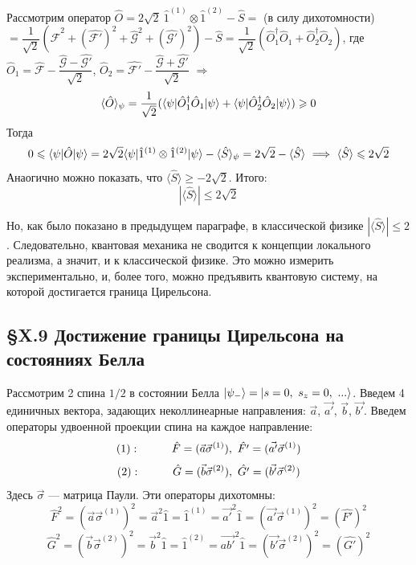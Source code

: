 Рассмотрим оператор $\hat{O} = 2\sqrt{2}~\hat{1}^{(1)}\otimes\hat{1}^{(2)} - \hat{S} = $ (в силу дихотомности) $= \dfrac{1}{\sqrt{2}}(\hat{\mathcal{F}}^2 + (\hat{\mathcal{F'}})^2 + \hat{\mathcal{G}}^2 + (\hat{\mathcal{G'}})^2) - \hat{S} = \dfrac{1}{\sqrt{2}}(\hat{O}_1^\dagger\hat{O}_1 + \hat{O}_2^\dagger\hat{O}_2)$, где $\hat{O}_1 = \hat{\mathcal{F}} - \dfrac{\hat{\mathcal{G}} - \hat{\mathcal{G'}}}{\sqrt{2}}$, $\hat{O}_2 = \hat{\mathcal{F'}} - \dfrac{\hat{\mathcal{G}} + \hat{\mathcal{G'}}}{\sqrt{2}}$ $\Longrightarrow$
\[
\langle\hat{O}\rangle_\psi = \dfrac{1}{\sqrt{2}}(\langle \psi | \hat{O}_1^\dagger\hat{O}_1 | \psi \rangle + \langle \psi | \hat{O}_2^\dagger\hat{O}_2 | \psi \rangle) \geqslant 0
\]
Тогда
\[
0 \leq \braupket{\psi}{\hat{O}}{\psi} = 2\sqrt{2} \braupket{\psi}{\hat{1}^{(1)}\otimes\hat{1}^{(2)}}{\psi} - \langle \hat{S}\rangle_\psi = 2\sqrt{2} - \langle \hat{S}\rangle \ \Longrightarrow \ \langle \hat{S}\rangle \leq 2\sqrt{2}
\]  
Анаогично можно показать, что $\langle \hat{S}\rangle \geq -2\sqrt{2}$. Итого:
\[
|\langle \hat{S}\rangle| \leq 2\sqrt{2}
\]

Но, как было показано в предыдущем параграфе, в классической физике $|\langle \hat{S}\rangle| \leq 2$. Следовательно, квантовая механика не сводится к концепции локального реализма, а значит, и к классической физике. Это можно измерить экспериментально, и, более того, можно предъявить квантовую систему, на которой достигается граница Цирельсона.\\




\subsection{\S X.9 Достижение границы Цирельсона на состояниях Белла}
Рассмотрим 2 спина $1/2$ в состоянии Белла $| \psi_- \rangle = | s = 0,~s_z = 0,~... \rangle$. Введем 4 единичных вектора, задающих неколлинеарные направления: $\vec{a}$, $\vec{a'}$, $\vec{b}$, $\vec{b'}$. Введем операторы удвоенной проекции спина на каждое направление:
\[
(1):\tab \hat{F} = (\vec{a}\vec{\sigma}^{(1)}), \ \hat{F'} = (\vec{a'}\vec{\sigma}^{(1)})
\]
\[
(2):\tab \hat{G} = (\vec{b}\vec{\sigma}^{(2)}), \ \hat{G'} = (\vec{b'}\vec{\sigma}^{(2)})
\]
Здесь $\vec{\sigma}$ --- матрица Паули. Эти операторы дихотомны:
\[
\hat{F}^2 = (\vec{a}\vec{\sigma}^{(1)})^2 = \vec{a}^2\hat{1} = \hat{1}^{(1)} = \vec{a'}^2\hat{1} = (\vec{a'}\vec{\sigma}^{(1)})^2 = (\hat{F'})^2
\]
\[
\hat{G}^2 = (\vec{b}\vec{\sigma}^{(2)})^2 = \vec{b}^2\hat{1} = \hat{1}^{(2)} = \vec{ab'}^2\hat{1} = (\vec{b'}\vec{\sigma}^{(2)})^2 = (\hat{G'})^2
\]

